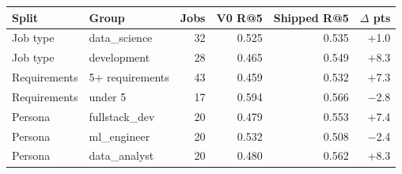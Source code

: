 \begin{tabular}{llrrrr}
\toprule
Split & Group & Jobs & V0 R@5 & Shipped R@5 & $\Delta$ pts \\
\midrule
Job type & data\_science & 32 & 0.525 & 0.535 & +1.0 \\
Job type & development & 28 & 0.465 & 0.549 & +8.3 \\
Requirements & 5+ requirements & 43 & 0.459 & 0.532 & +7.3 \\
Requirements & under 5 & 17 & 0.594 & 0.566 & $-$2.8 \\
Persona & fullstack\_dev & 20 & 0.479 & 0.553 & +7.4 \\
Persona & ml\_engineer & 20 & 0.532 & 0.508 & $-$2.4 \\
Persona & data\_analyst & 20 & 0.480 & 0.562 & +8.3 \\
\bottomrule
\end{tabular}
